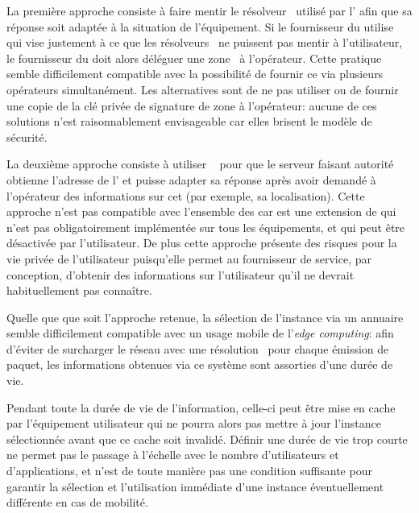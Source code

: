 \documentclass[../main.tex]{subfiles}
\begin{document}
La première approche consiste à faire mentir le résolveur~ utilisé par l’ afin que sa réponse soit adaptée à la situation de l’équipement. Si le fournisseur du  utilise ~\cite{rfc9364} qui vise justement à ce que les résolveurs~ ne puissent pas mentir à l’utilisateur, le fournisseur du  doit alors déléguer une zone~ à l’opérateur.
Cette pratique semble difficilement compatible avec la possibilité de fournir ce  via plusieurs opérateurs simultanément. Les alternatives sont de ne pas utiliser  ou de fournir une copie de la clé privée de signature de zone à l’opérateur: aucune de ces solutions n’est raisonnablement envisageable car elles brisent le modèle de sécurité.

La deuxième approche consiste à utiliser ~\cite{rfc7871} pour que le serveur  faisant autorité obtienne l’adresse de l’ et puisse adapter sa réponse après avoir demandé à l’opérateur des informations sur cet  (par exemple, sa localisation). Cette approche n’est pas compatible avec l’ensemble des  car  est une extension de  qui n’est pas obligatoirement implémentée sur tous les équipements, et qui peut être désactivée par l’utilisateur. De plus cette approche présente des risques pour la vie privée de l’utilisateur puisqu’elle permet au fournisseur de service, par conception, d’obtenir des informations sur l’utilisateur qu’il ne devrait habituellement pas connaître.

Quelle que que soit l’approche retenue, la sélection de l’instance via un annuaire semble difficilement compatible avec un usage mobile de l’\textit{edge computing}:
afin d’éviter de surcharger le réseau avec une résolution~ pour chaque émission de paquet, les informations obtenues via ce système sont assorties d’une durée de vie.

Pendant toute la durée de vie de l’information, celle-ci peut être mise en cache par l’équipement utilisateur qui ne pourra alors pas mettre à jour l’instance sélectionnée avant que ce cache soit invalidé. Définir une durée de vie trop courte ne permet pas le passage à l’échelle avec le nombre d’utilisateurs et d’applications, et n’est de toute manière pas une condition suffisante pour garantir la sélection et l’utilisation immédiate d’une instance éventuellement différente en cas de mobilité.
\end{document}
